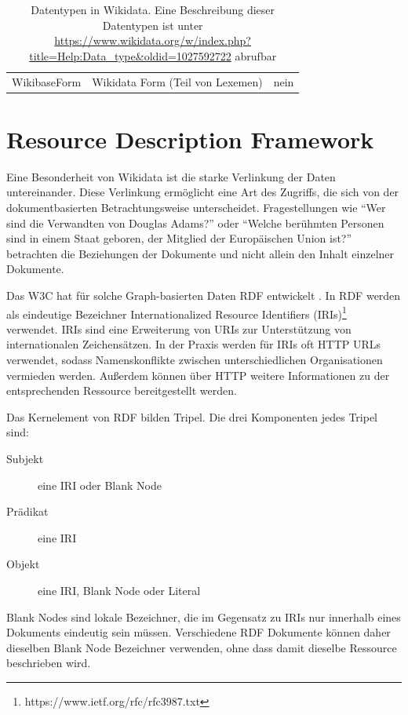 \begin{table}
\begin{adjustwidth}{-1.5cm}{-0.5cm}
\begin{minipage}{\textwidth}
\begin{tabular}{l p{} p{}}
      WikibaseForm     & Wikidata Form (Teil von Lexemen)                                                                                                                              & nein
    \end{tabular}
    \end{minipage}
  \end{adjustwidth}
  \caption{Datentypen in Wikidata. Eine Beschreibung dieser Datentypen ist unter \url{https://www.wikidata.org/w/index.php?title=Help:Data_type&oldid=1027592722} abrufbar}
  \label{tab:wd-datatypes}
\end{table}

\section{Resource Description Framework}
Eine Besonderheit von Wikidata ist die starke Verlinkung der Daten untereinander.
Diese Verlinkung ermöglicht eine Art des Zugriffs, die sich von der dokumentbasierten Betrachtungsweise unterscheidet.
Fragestellungen wie "`Wer sind die Verwandten von Douglas Adams?"' oder "`Welche berühmten Personen sind in einem Staat geboren, der Mitglied der Europäischen Union ist?"' betrachten die Beziehungen der Dokumente und nicht allein den Inhalt einzelner Dokumente.

Das W3C hat für solche Graph-basierten Daten RDF entwickelt \cite{rdf-spec}.
In RDF werden als eindeutige Bezeichner Internationalized Resource Identifiers (IRIs)\footnote{https://www.ietf.org/rfc/rfc3987.txt} verwendet.
IRIs sind eine Erweiterung von URIs zur Unterstützung von internationalen Zeichensätzen.
In der Praxis werden für IRIs oft HTTP URLs verwendet, sodass Namenskonflikte zwischen unterschiedlichen Organisationen vermieden werden.
Außerdem können über HTTP weitere Informationen zu der entsprechenden Ressource bereitgestellt werden.

Das Kernelement von RDF bilden Tripel. Die drei Komponenten jedes Tripel sind:
\begin{description}
\item[Subjekt] eine IRI oder Blank Node
\item[Prädikat] eine IRI
\item[Objekt] eine IRI, Blank Node oder Literal
\end{description}
Blank Nodes sind lokale Bezeichner, die im Gegensatz zu IRIs nur innerhalb eines Dokuments eindeutig sein müssen.
Verschiedene RDF Dokumente können daher dieselben Blank Node Bezeichner verwenden, ohne dass damit dieselbe Ressource beschrieben wird.

